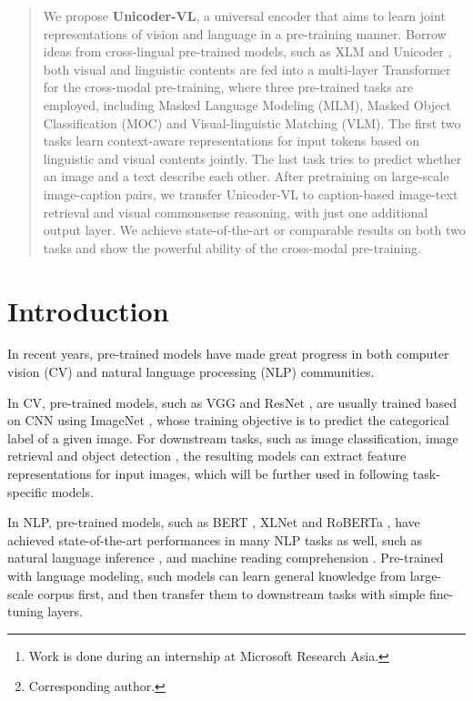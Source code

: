\documentclass[letterpaper]{article} \usepackage{aaai20}  \usepackage{times}  \usepackage{helvet} \usepackage{courier}  \usepackage[hyphens]{url}  \usepackage{graphicx} \urlstyle{rm} \def\UrlFont{\rm}  \usepackage{graphicx}  \frenchspacing  \setlength{\pdfpagewidth}{8.5in}  \setlength{\pdfpageheight}{11in}  \usepackage{amssymb}
\author{
Gen Li,\textsuperscript{\rm 1}\thanks{Work is done during an internship at Microsoft Research Asia.} 
Nan Duan,\textsuperscript{\rm 2}
Yuejian Fang,\textsuperscript{\rm 1}\thanks{Corresponding author.} Ming Gong,\textsuperscript{\rm 3} Daxin Jiang,\textsuperscript{\rm 3} Ming Zhou\textsuperscript{\rm 2}  \\
\textsuperscript{\rm 1}School of Software \& Microelectronics, Peking University, Beijing, China  \\
\textsuperscript{\rm 2}Natural Language Computing, Microsoft Research Asia, Beijing, China \\
\textsuperscript{\rm 3}STCA NLP Group, Microsoft, Beijing, China \\
ligen.li@pku.edu.cn, fangyj@ss.pku.edu.cn \\
\{nanduan, migon, djiang, mingzhou\}@microsoft.com 
}
\begin{document}
\maketitle

\begin{abstract}
We propose \textbf{Unicoder-VL}, a universal encoder that aims to learn joint representations of vision and language in a pre-training manner. 
Borrow ideas from cross-lingual pre-trained models, such as XLM \cite{lample2019cross} and Unicoder \cite{huang2019unicoder}, both visual and linguistic contents are fed into a multi-layer Transformer \cite{vaswani2017attention} for the cross-modal pre-training, where three pre-trained tasks are employed, including Masked Language Modeling (MLM), Masked Object Classification (MOC) and Visual-linguistic Matching (VLM).
The first two tasks learn context-aware representations for input tokens based on linguistic and visual contents jointly. The last task tries to predict whether an image and a text describe each other. 
After pretraining on large-scale image-caption pairs, we transfer Unicoder-VL to caption-based image-text retrieval and visual commonsense reasoning, with just one additional output layer. We achieve state-of-the-art or comparable results on both two tasks and show the powerful ability of the cross-modal pre-training.
\end{abstract}
\section{Introduction}

In recent years, pre-trained models have made great progress in both computer vision (CV) and natural language processing (NLP) communities.

In CV, pre-trained models, such as VGG \cite{simonyan2014very} and ResNet \cite{he2016deep}, are usually trained based on CNN using ImageNet \cite{deng2009imagenet}, whose training objective is to predict the categorical label of a given image. 
For downstream tasks, such as image classification, image retrieval \cite{karpathy2015deep} \cite{lee2018stacked} and object detection \cite{ren2015faster}, the resulting models can extract feature representations for input images, which will be further used in following task-specific models. 

In NLP, pre-trained models, such as BERT \cite{devlin2018bert}, XLNet \cite{yang2019xlnet} and RoBERTa \cite{liu2019roberta}, have achieved state-of-the-art performances in many NLP tasks as well, such as natural language inference \cite{bowman2015large}, and machine reading comprehension \cite{rajpurkar2016squad}. 
Pre-trained with language modeling, such models can learn general knowledge from large-scale corpus first, and then transfer them to downstream tasks with simple fine-tuning layers.
\end{document}
